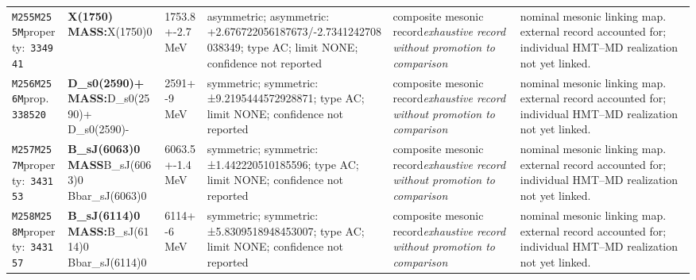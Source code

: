 \begin{landscape}
\begin{longtable}{L{1.85cm}L{4.45cm}L{2.35cm}L{4.05cm}L{3.35cm}L{7.15cm}}
\texttt{M255}\newline \texttt{M255M}\newline property:\ \texttt{334941} & \textbf{X(1750) MASS:}\newline X(1750)0 & 1753.8+-2.7\,MeV & asymmetric; asymmetric: +2.676722056187673/-2.7341242708038349; type AC; limit NONE; confidence not reported & composite mesonic record\newline \emph{exhaustive record without promotion to comparison} & nominal mesonic linking map. external record accounted for; individual HMT--MD realization not yet linked. \\
\texttt{M256}\newline \texttt{M256M}\newline prop.\ \texttt{338520} & \textbf{D\_\allowbreak{}s0(2590)+ MASS:}\newline D\_\allowbreak{}s0(2590)+ \textbar{}\allowbreak{} D\_\allowbreak{}s0(2590)- & 2591+-9\,MeV & symmetric; symmetric: ±9.2195444572928871; type AC; limit NONE; confidence not reported & composite mesonic record\newline \emph{exhaustive record without promotion to comparison} & nominal mesonic linking map. external record accounted for; individual HMT--MD realization not yet linked. \\
\texttt{M257}\newline \texttt{M257M}\newline property:\ \texttt{343153} & \textbf{B\_\allowbreak{}sJ(6063)0 MASS}\newline B\_\allowbreak{}sJ(6063)0 \textbar{}\allowbreak{} Bbar\_\allowbreak{}sJ(6063)0 & 6063.5+-1.4\,MeV & symmetric; symmetric: ±1.442220510185596; type AC; limit NONE; confidence not reported & composite mesonic record\newline \emph{exhaustive record without promotion to comparison} & nominal mesonic linking map. external record accounted for; individual HMT--MD realization not yet linked. \\
\texttt{M258}\newline \texttt{M258M}\newline property:\ \texttt{343157} & \textbf{B\_\allowbreak{}sJ(6114)0 MASS:}\newline B\_\allowbreak{}sJ(6114)0 \textbar{}\allowbreak{} Bbar\_\allowbreak{}sJ(6114)0 & 6114+-6\,MeV & symmetric; symmetric: ±5.8309518948453007; type AC; limit NONE; confidence not reported & composite mesonic record\newline \emph{exhaustive record without promotion to comparison} & nominal mesonic linking map. external record accounted for; individual HMT--MD realization not yet linked. \\

\end{longtable}
\end{landscape}
